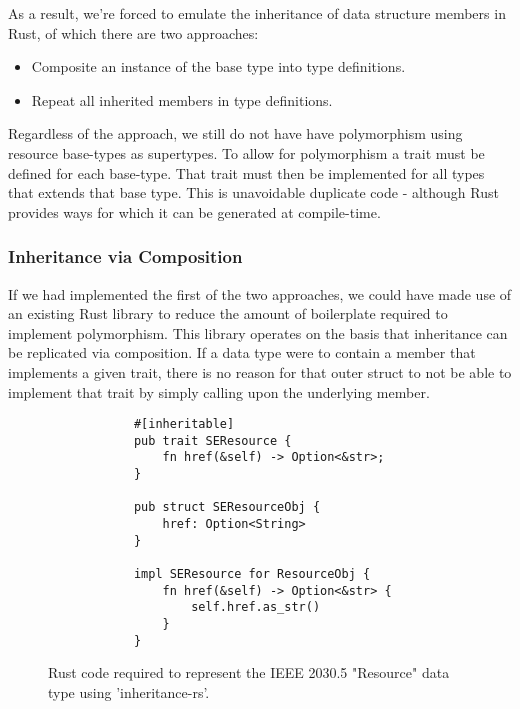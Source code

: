 As a result, we're forced to emulate the inheritance of data structure members in Rust, of which there are two approaches:

\begin{itemize}
    \item Composite an instance of the base type into type definitions.
    \item Repeat all inherited members in type definitions.
\end{itemize}

Regardless of the approach, we still do not have have polymorphism using resource base-types as supertypes.
To allow for polymorphism a trait must be defined for each base-type. That trait must then be implemented for all types that extends that base type. 
This is unavoidable duplicate code - although Rust provides ways for which it can be generated at compile-time.

\subsubsection{Inheritance via Composition}

If we had implemented the first of the two approaches, we could have made use of an existing Rust library to reduce the amount of boilerplate required to implement polymorphism.
This library operates on the basis that inheritance can be replicated via composition. If a data type were to contain a member that implements a given trait, there is no reason for that outer struct to not be able to implement that trait by simply calling upon the underlying member.


\begin{figure}[H]
    \begin{center}
        \begin{lstlisting}
            #[inheritable]
            pub trait SEResource {
                fn href(&self) -> Option<&str>;
            }

            pub struct SEResourceObj {
                href: Option<String>
            }

            impl SEResource for ResourceObj {
                fn href(&self) -> Option<&str> {
                    self.href.as_str()
                }
            }
        \end{lstlisting}
        \label{fig:resinher}
        \caption{Rust code required to represent the IEEE 2030.5 "Resource" data type using 'inheritance-rs'.}
    \end{center}
\end{figure}

